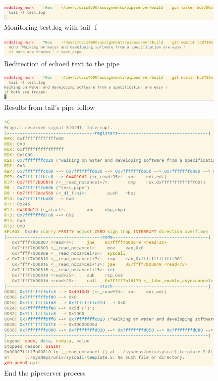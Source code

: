 \documentclass[letter,12pt,sffamily]{article}
\begin{document}
\begin{figure}[H]
	\centering
	\includegraphics[width=1\linewidth]{./images/9}
	\caption[tailf]{Monitoring test.log with tail -f}
	\label{fig:9}
\end{figure}
\begin{figure}[H]
	\centering
	\includegraphics[width=1\linewidth]{./images/10}
	\caption[text_redirection]{Redirection of echoed text to the pipe}
	\label{fig:10}
\end{figure}
\begin{figure}[H]
	\centering
	\includegraphics[width=1\linewidth]{./images/11}
	\caption[tail_pipe_follow]{Results from tail's pipe follow}
	\label{fig:11}
\end{figure}
\begin{figure}[H]
	\centering
	\includegraphics[width=1\linewidth]{./images/12}
	\caption[sigint]{End the pipeserver process}
	\label{fig:12}
\end{figure}
\end{document}
